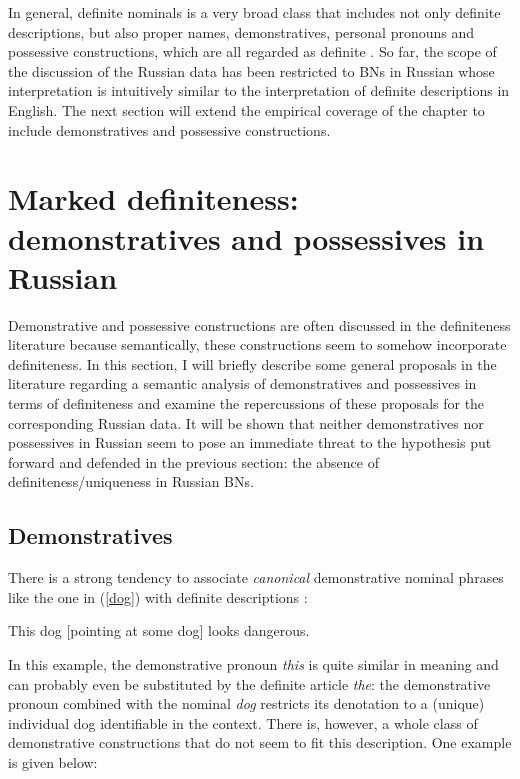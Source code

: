 \documentclass[output=paper,colorlinks,citecolor=brown]{langscibook}
\begin{document}
In general, definite nominals is a very broad class that includes not only definite descriptions, but also proper names, demonstratives, personal pronouns and possessive constructions, which are all regarded as definite \citep[cf.][]{lyons99}. So far, the scope of the discussion of the Russian data has been restricted to BNs in Russian whose interpretation is intuitively similar to the interpretation of definite descriptions in English. The next section will extend the empirical coverage of the chapter to include demonstratives and possessive constructions. 

\section{Marked definiteness: demonstratives and possessives in Russian} \label{markeddef}


Demonstrative and possessive constructions are often discussed in the definiteness literature \citep[cf.][etc.]{hawkins78, lyons99} because semantically, these constructions seem to somehow incorporate definiteness. In this section, I will briefly describe some general proposals in the literature regarding a semantic analysis of demonstratives and possessives in terms of definiteness and examine the repercussions of these proposals for the corresponding Russian data. It will be shown that neither demonstratives nor possessives in Russian seem to pose an immediate threat to the hypothesis put forward and defended in the previous section: the absence of definiteness/uniqueness in Russian BNs. 

\subsection{Demonstratives} \label{demonstratives}

There is a strong tendency to associate \textit{canonical} demonstrative nominal phrases like the one in (\ref{dog}) with definite descriptions \citep[cf.][]{lyons99, elbourne08, simik16}: 

\ea \label{dog}
This dog [pointing at some dog] looks dangerous. 
\z

\noindent In this example, the demonstrative pronoun \textit{this} is quite similar in meaning and can probably even be substituted by the definite article \textit{the}: the demonstrative pronoun combined with the nominal \textit{dog} restricts its denotation to a (unique) individual dog identifiable in the context. There is, however, a whole class of demonstrative constructions that do not seem to fit this description. One example is given below: 
\end{document}
